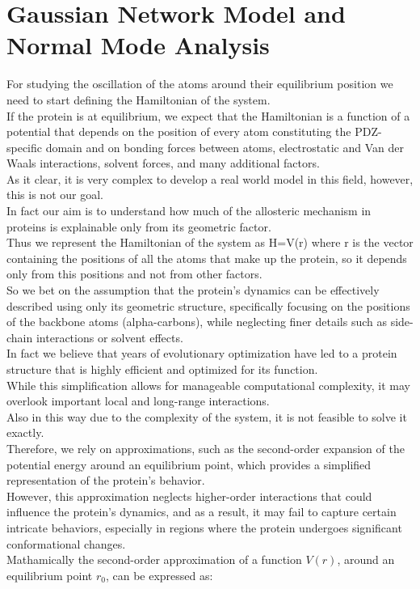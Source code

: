 \documentclass[English, Lau, oneside]{sapthesis}
\begin{document}
\section{Gaussian Network Model and Normal Mode Analysis}
\noindent For studying the oscillation of the atoms around their equilibrium position we need to start defining the Hamiltonian of the system.\\
If the protein is at equilibrium, we expect that the Hamiltonian is a function of a potential that depends on the position of every atom constituting the PDZ-specific domain and on bonding forces between atoms, electrostatic and Van der Waals interactions, solvent forces, and many additional factors.\\
As it clear, it is very complex to develop a real world model in this field, 
however, this is not our goal.\\
In fact our aim is to understand how much of the allosteric mechanism in proteins is explainable only from its geometric factor.\\
Thus we represent the Hamiltonian of the system as H=V(r) where r is the vector containing the positions of all the atoms that make up the protein, so it depends only from this positions and not from other factors.\\
So we bet on the assumption that the protein’s dynamics can be effectively described using only its geometric structure, 
specifically focusing on the positions of the backbone atoms (alpha-carbons), 
while neglecting finer details such as side-chain interactions or solvent effects.\\
In fact we believe that years of evolutionary optimization have led to a protein structure that is highly efficient and optimized for its function.\\
While this simplification allows for manageable computational complexity, it may overlook important local and long-range interactions.\\
Also in this way due to the complexity of the system, it is not feasible to solve it exactly.\\
Therefore, we rely on approximations, such as the second-order expansion of the potential energy around an equilibrium point, 
which provides a simplified representation of the protein's behavior.\\
However, this approximation neglects higher-order interactions that could influence the protein’s dynamics, and as a result, it may fail to capture certain intricate behaviors, especially in regions where the protein undergoes significant conformational changes.\\
Mathamically the second-order approximation of a function \( V({r}) \), around an equilibrium point \( {r}_0 \), can be expressed as:\cite{ref9}
\end{document}

